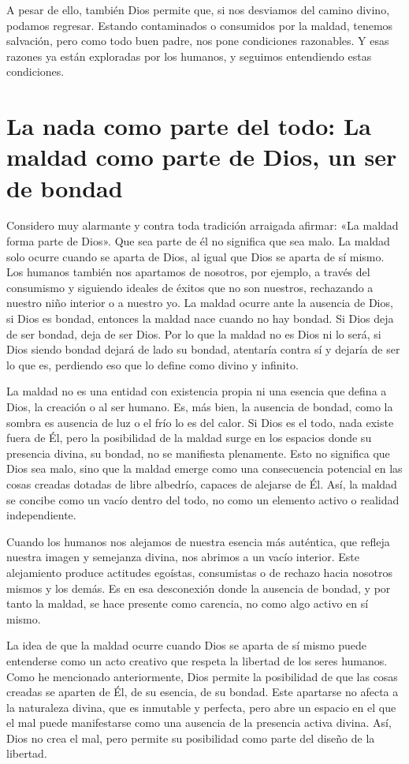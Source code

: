 \documentclass[letterpaper,13pt]{article}
\begin{document}
A pesar de ello, también Dios permite que, si nos desviamos del camino divino, podamos regresar. Estando contaminados o consumidos por la maldad, tenemos salvación, pero como todo buen padre, nos pone condiciones razonables. Y esas razones ya están exploradas por los humanos, y seguimos entendiendo estas condiciones.

\section{La nada como parte del todo: La maldad como parte de Dios, un ser de bondad}

Considero muy alarmante y contra toda tradición arraigada afirmar: «La maldad forma parte de Dios». Que sea parte de él no significa que sea malo. La maldad solo ocurre cuando se aparta de Dios, al igual que Dios se aparta de sí mismo. Los humanos también nos apartamos de nosotros, por ejemplo, a través del consumismo y siguiendo ideales de éxitos que no son nuestros, rechazando a nuestro niño interior o a nuestro yo. La maldad ocurre ante la ausencia de Dios, si Dios es bondad, entonces la maldad nace cuando no hay bondad. Si Dios deja de ser bondad, deja de ser Dios. Por lo que la maldad no es Dios ni lo será, si Dios siendo bondad dejará de lado su bondad, atentaría contra sí y dejaría de ser lo que es, perdiendo eso que lo define como divino y infinito.

La maldad no es una entidad con existencia propia ni una esencia que defina a Dios, la creación o al ser humano. Es, más bien, la ausencia de bondad, como la sombra es ausencia de luz o el frío lo es del calor. Si Dios es el todo, nada existe fuera de Él, pero la posibilidad de la maldad surge en los espacios donde su presencia divina, su bondad, no se manifiesta plenamente. Esto no significa que Dios sea malo, sino que la maldad emerge como una consecuencia potencial en las cosas creadas dotadas de libre albedrío, capaces de alejarse de Él. Así, la maldad se concibe como un vacío dentro del todo, no como un elemento activo o realidad independiente.

Cuando los humanos nos alejamos de nuestra esencia más auténtica, que refleja nuestra imagen y semejanza divina, nos abrimos a un vacío interior. Este alejamiento produce actitudes egoístas, consumistas o de rechazo hacia nosotros mismos y los demás. Es en esa desconexión donde la ausencia de bondad, y por tanto la maldad, se hace presente como carencia, no como algo activo en sí mismo.

La idea de que la maldad ocurre cuando Dios se aparta de sí mismo puede entenderse como un acto creativo que respeta la libertad de los seres humanos. Como he mencionado anteriormente, Dios permite la posibilidad de que las cosas creadas se aparten de Él, de su esencia, de su bondad. Este apartarse no afecta a la naturaleza divina, que es inmutable y perfecta, pero abre un espacio en el que el mal puede manifestarse como una ausencia de la presencia activa divina. Así, Dios no crea el mal, pero permite su posibilidad como parte del diseño de la libertad.
\end{document}
